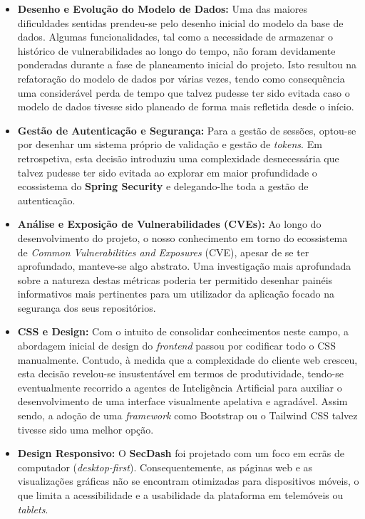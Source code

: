 \begin{itemize}
	\item \textbf{Desenho e Evolução do Modelo de Dados:} Uma das maiores dificuldades sentidas prendeu-se pelo desenho inicial do modelo da base de dados. Algumas funcionalidades, tal como a necessidade de armazenar o histórico de vulnerabilidades ao longo do tempo, não foram devidamente ponderadas durante a fase de planeamento inicial do projeto. Isto resultou na refatoração do modelo de dados por várias vezes, tendo como consequência uma considerável perda de tempo que talvez pudesse ter sido evitada caso o modelo de dados tivesse sido planeado de forma mais refletida desde o início.
	
	\item \textbf{Gestão de Autenticação e Segurança:} Para a gestão de sessões, optou-se por desenhar um sistema próprio de validação e gestão de \textit{tokens}. Em retrospetiva, esta decisão introduziu uma complexidade desnecessária que talvez pudesse ter sido evitada ao explorar em maior profundidade o ecossistema do \textbf{Spring Security} e delegando-lhe toda a gestão de autenticação.

	\item \textbf{Análise e Exposição de Vulnerabilidades (CVEs):} Ao longo do desenvolvimento do projeto, o nosso conhecimento em torno do ecossistema de \textit{Common Vulnerabilities and Exposures} (CVE), apesar de se ter aprofundado, manteve-se algo abstrato. Uma investigação mais aprofundada sobre a natureza destas métricas poderia ter permitido desenhar painéis informativos mais pertinentes para um utilizador da aplicação focado na segurança dos seus repositórios.
	
	\item \textbf{CSS e Design:} Com o intuito de consolidar conhecimentos neste campo, a abordagem inicial de design do \textit{frontend} passou por codificar todo o CSS manualmente. Contudo, à medida que a complexidade do cliente web cresceu, esta decisão revelou-se insustentável em termos de produtividade, tendo-se eventualmente recorrido a agentes de Inteligência Artificial para auxiliar o desenvolvimento de uma interface visualmente apelativa e agradável. Assim sendo, a adoção de uma \textit{framework} como Bootstrap ou o Tailwind CSS talvez tivesse sido uma melhor opção.
	
	\item \textbf{Design Responsivo:} O \textbf{SecDash} foi projetado com um foco em ecrãs de computador (\textit{desktop-first}). Consequentemente, as páginas web e as visualizações gráficas não se encontram otimizadas para dispositivos móveis, o que limita a acessibilidade e a usabilidade da plataforma em telemóveis ou \textit{tablets}.
\end{itemize}

